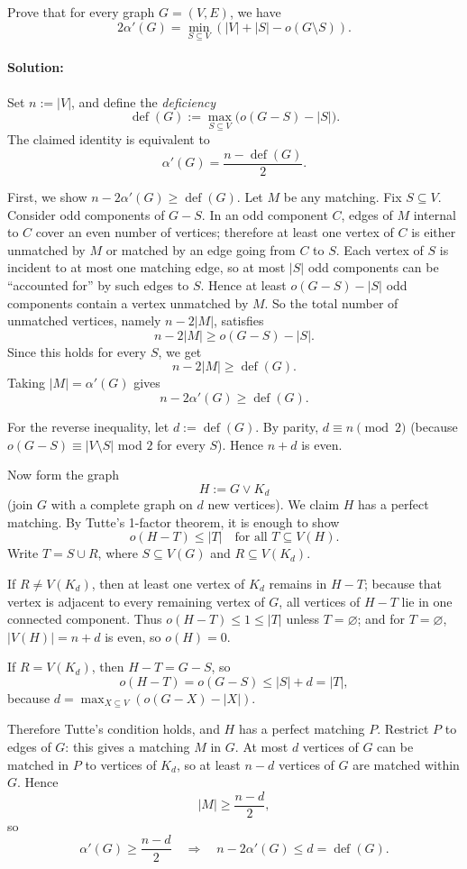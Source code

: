 \documentclass[a4paper,12pt]{article}
\newcommand{\card}[1]{\left| #1 \right|}
\begin{document}
Prove that for every graph $G = (V, E)$, we have
\[ 2 \alpha'(G) = \min_{S \subseteq V} \left( \card{V} + \card{S} - o( G \setminus S ) \right). \]

\paragraph{Solution:} Set $n:=|V|$, and define the \emph{deficiency}
\[
\operatorname{def}(G):=\max_{S\subseteq V}\bigl(o(G-S)-|S|\bigr).
\]
The claimed identity is equivalent to
\[
\alpha'(G)=\frac{n-\operatorname{def}(G)}{2}.
\]

First, we show $n-2\alpha'(G)\ge \operatorname{def}(G)$. Let $M$ be any matching.
Fix $S\subseteq V$. Consider odd components of $G-S$.
In an odd component $C$, edges of $M$ internal to $C$ cover an even number of vertices;
therefore at least one vertex of $C$ is either unmatched by $M$ or matched by an edge going from $C$ to $S$.
Each vertex of $S$ is incident to at most one matching edge, so at most $|S|$ odd components can be ``accounted for'' by such edges to $S$.
Hence at least $o(G-S)-|S|$ odd components contain a vertex unmatched by $M$.
So the total number of unmatched vertices, namely $n-2|M|$, satisfies
\[
n-2|M|\ge o(G-S)-|S|.
\]
Since this holds for every $S$, we get
\[
n-2|M|\ge \operatorname{def}(G).
\]
Taking $|M|=\alpha'(G)$ gives
\[
n-2\alpha'(G)\ge \operatorname{def}(G).\tag{1}
\]

For the reverse inequality, let $d:=\operatorname{def}(G)$.
By parity, $d\equiv n \pmod 2$ (because $o(G-S)\equiv |V\setminus S|$ mod $2$ for every $S$).
Hence $n+d$ is even.

Now form the graph
\[
H:=G\vee K_d
\]
(join $G$ with a complete graph on $d$ new vertices).
We claim $H$ has a perfect matching.
By Tutte's 1-factor theorem, it is enough to show
\[
o(H-T)\le |T| \quad \text{for all } T\subseteq V(H).
\]
Write $T=S\cup R$, where $S\subseteq V(G)$ and $R\subseteq V(K_d)$.

If $R\neq V(K_d)$, then at least one vertex of $K_d$ remains in $H-T$; because that vertex is adjacent to every remaining vertex of $G$, all vertices of $H-T$ lie in one connected component. Thus $o(H-T)\le 1\le |T|$ unless $T=\varnothing$; and for $T=\varnothing$, $|V(H)|=n+d$ is even, so $o(H)=0$.

If $R=V(K_d)$, then $H-T=G-S$, so
\[
o(H-T)=o(G-S)\le |S|+d=|T|,
\]
because $d=\max_{X\subseteq V}(o(G-X)-|X|)$.

Therefore Tutte's condition holds, and $H$ has a perfect matching $P$.
Restrict $P$ to edges of $G$: this gives a matching $M$ in $G$.
At most $d$ vertices of $G$ can be matched in $P$ to vertices of $K_d$, so at least $n-d$ vertices of $G$ are matched within $G$.
Hence
\[
|M|\ge \frac{n-d}{2},
\]
so
\[
\alpha'(G)\ge \frac{n-d}{2}
\quad\Longrightarrow\quad
n-2\alpha'(G)\le d=\operatorname{def}(G).\tag{2}
\]
\end{document}
